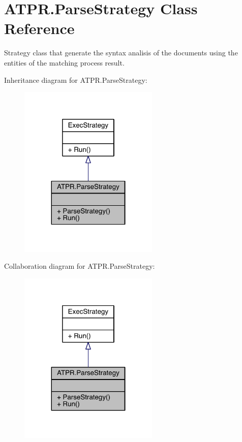 \hypertarget{class_a_t_p_r_1_1_parse_strategy}{}\section{A\+T\+P\+R.\+Parse\+Strategy Class Reference}
\label{class_a_t_p_r_1_1_parse_strategy}


Strategy class that generate the syntax analisis of the documents using the entities of the matching process result.  




Inheritance diagram for A\+T\+P\+R.\+Parse\+Strategy\+:
\nopagebreak
\begin{figure}[H]
\begin{center}
\leavevmode
\includegraphics[width=188pt]{d0/d36/class_a_t_p_r_1_1_parse_strategy__inherit__graph}
\end{center}
\end{figure}


Collaboration diagram for A\+T\+P\+R.\+Parse\+Strategy\+:
\nopagebreak
\begin{figure}[H]
\begin{center}
\leavevmode
\includegraphics[width=188pt]{d8/d18/class_a_t_p_r_1_1_parse_strategy__coll__graph}
\end{center}
\end{figure}
